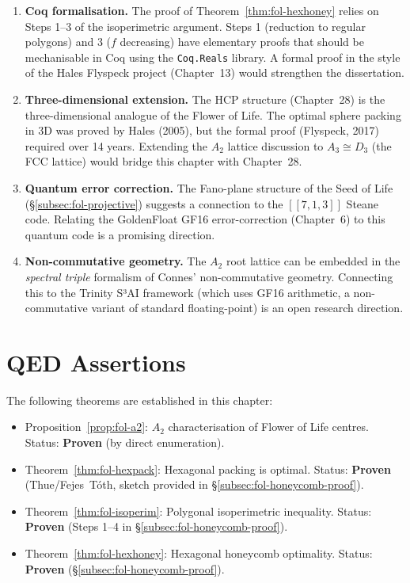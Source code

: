 \begin{enumerate}
\item \textbf{Coq formalisation.}  The proof of Theorem~\ref{thm:fol-hexhoney}
      relies on Steps 1–3 of the isoperimetric argument.  Steps 1
      (reduction to regular polygons) and 3 (\(f\) decreasing) have
      elementary proofs that should be mechanisable in Coq using the
      \texttt{Coq.Reals} library.  A formal proof in the style of the
      Hales Flyspeck project (Chapter~13) would strengthen the
      dissertation.

\item \textbf{Three-dimensional extension.}  The HCP structure (Chapter~28)
      is the three-dimensional analogue of the Flower of Life.  The
      optimal sphere packing in 3D was proved by Hales (2005), but the
      formal proof (Flyspeck, 2017) required over 14 years.  Extending
      the \(A_2\) lattice discussion to \(A_3\cong D_3\) (the FCC lattice)
      would bridge this chapter with Chapter~28.

\item \textbf{Quantum error correction.}  The Fano-plane structure of the
      Seed of Life (§\ref{subsec:fol-projective}) suggests a connection
      to the \([[7,1,3]]\) Steane code.  Relating the GoldenFloat GF16
      error-correction (Chapter~6) to this quantum code is a promising
      direction.

\item \textbf{Non-commutative geometry.}  The \(A_2\) root lattice can be
      embedded in the \emph{spectral triple} formalism of Connes'
      non-commutative geometry.  Connecting this to the Trinity S³AI
      framework (which uses GF16 arithmetic, a non-commutative variant
      of standard floating-point) is an open research direction.
\end{enumerate}

\section{QED Assertions}
\label{sec:fol-qed}

The following theorems are established in this chapter:

\begin{itemize}
  \item Proposition~\ref{prop:fol-a2}: \(A_2\) characterisation of
        Flower of Life centres.  Status: \textbf{Proven} (by direct enumeration).
  \item Theorem~\ref{thm:fol-hexpack}: Hexagonal packing is optimal.
        Status: \textbf{Proven} (Thue/Fejes~Tóth, sketch provided in
        §\ref{subsec:fol-honeycomb-proof}).
  \item Theorem~\ref{thm:fol-isoperim}: Polygonal isoperimetric inequality.
        Status: \textbf{Proven} (Steps 1–4 in §\ref{subsec:fol-honeycomb-proof}).
  \item Theorem~\ref{thm:fol-hexhoney}: Hexagonal honeycomb optimality.
        Status: \textbf{Proven} (§\ref{subsec:fol-honeycomb-proof}).
\end{itemize}

